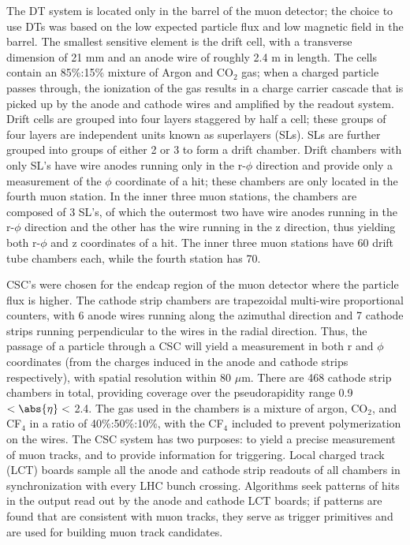 The DT system is located only in the barrel of the muon detector; the choice to use DTs was based on the low expected particle flux and low magnetic field in the barrel. The smallest sensitive element is the drift cell, with a transverse dimension of 21 mm and an anode wire of roughly 2.4 m in length. The cells contain an 85\%:15\% mixture of Argon and CO$_2$ gas; when a charged particle passes through, the ionization of the gas results in a charge carrier cascade that is picked up by the anode and cathode wires and amplified by the readout system. Drift cells are grouped into four layers staggered by half a cell; these groups of four layers are independent units known as superlayers (SLs). SLs are further grouped into groups of either 2 or 3 to form a drift chamber. Drift chambers with only SL's have wire anodes running only in the r-$\phi$ direction and provide only a measurement of the $\phi$ coordinate of a hit; these chambers are only located in the fourth muon station. In the inner three muon stations, the chambers are composed of 3 SL's, of which the outermost two have wire anodes running in the r-$\phi$ direction and the other has the wire running in the z direction, thus yielding both r-$\phi$ and z coordinates of a hit. The inner three muon stations have 60 drift tube chambers each, while the fourth station has 70.

CSC's were chosen for the endcap region of the muon detector where the particle flux is higher. The cathode strip chambers are trapezoidal multi-wire proportional counters, with 6 anode wires running along the azimuthal direction and 7 cathode strips running perpendicular to the wires in the radial direction. Thus, the passage of a particle through a CSC will yield a measurement in both r and $\phi$ coordinates (from the charges induced in the anode and cathode strips respectively), with spatial resolution within 80 $\mu$m. There are 468 cathode strip chambers in total, providing coverage over the pseudorapidity range 0.9 $< \abs{\eta} <$ 2.4. The gas used in the chambers is a mixture of argon, CO$_2$, and CF$_4$ in a ratio of 40\%:50\%:10\%, with the CF$_4$ included to prevent polymerization on the wires. The CSC system has two purposes: to yield a precise measurement of muon tracks, and to provide information for triggering. Local charged track (LCT) boards sample all the anode and cathode strip readouts of all chambers in synchronization with every LHC bunch crossing. Algorithms seek patterns of hits in the output read out by the anode and cathode LCT boards; if patterns are found that are consistent with muon tracks, they serve as trigger primitives and are used for building muon track candidates.

